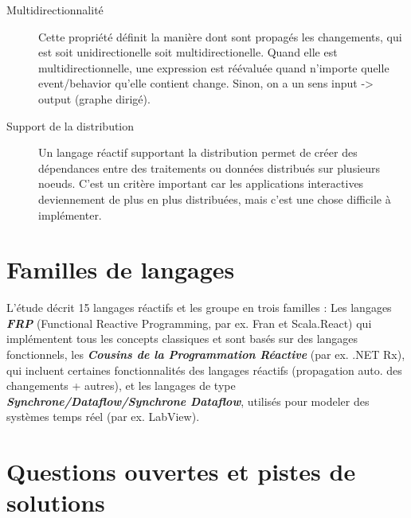\documentclass[10pt,final]{IEEEtran}
\begin{document}
\begin{description}
    \item[Multidirectionnalité]
    Cette propriété définit la manière dont sont propagés les changements, qui est soit unidirectionelle soit multidirectionelle. Quand elle est multidirectionnelle, une expression est réévaluée quand n'importe quelle event/behavior qu'elle contient change. Sinon, on a un sens input -> output (graphe dirigé).
    
    \item[Support de la distribution]
    Un langage réactif supportant la distribution permet de créer des dépendances entre des traitements ou données distribués sur plusieurs noeuds. C'est un critère important car les applications interactives deviennement de plus en plus distribuées, mais c'est une chose difficile à implémenter.
\end{description}


\section{Familles de langages}

L'étude décrit 15 langages réactifs et les groupe en trois familles : Les langages \textit{\textbf{FRP}} (Functional Reactive Programming, par ex. Fran et Scala.React) qui implémentent tous les concepts classiques et sont basés sur des langages fonctionnels, les \textit{\textbf{Cousins de la Programmation Réactive}} (par ex. .NET Rx), qui incluent certaines fonctionnalités des langages réactifs (propagation auto. des changements + autres), et les langages de type \textit{\textbf{Synchrone/Dataflow/Synchrone Dataflow}}, utilisés pour modeler des systèmes temps réel (par ex. LabView). 

\section{Questions ouvertes et pistes de solutions}
\end{document}
